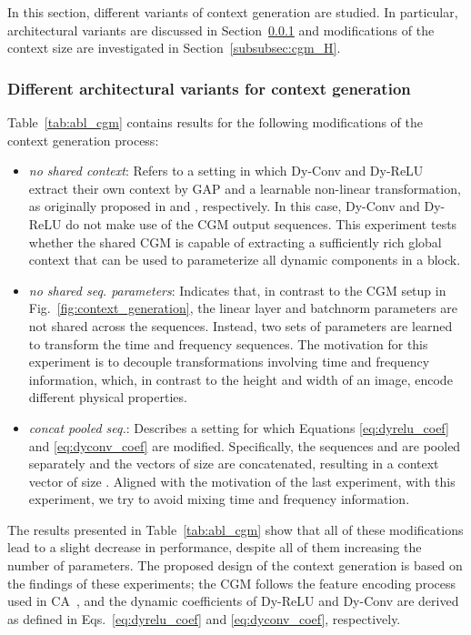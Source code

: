 \documentclass[lettersize,journal]{IEEEtran}
\begin{document}
In this section, different variants of context generation are studied. In particular, architectural variants are discussed in Section~\ref{subsubsec:cgm_variants} and modifications of the context size  are investigated in Section~\ref{subsubsec:cgm_H}.

\subsubsection{Different architectural variants for context generation}
\label{subsubsec:cgm_variants}

Table~\ref{tab:abl_cgm} contains results for the following modifications of the context generation process:
\begin{itemize}
    \item \textit{no shared context}: Refers to a setting in which Dy-Conv and Dy-ReLU extract their own context by GAP and a learnable non-linear transformation, as originally proposed in \cite{chen2020dynamic_conv} and \cite{chen2020dynamic_relu}, respectively. In this case, Dy-Conv and Dy-ReLU do not make use of the CGM output sequences. This experiment tests whether the shared CGM is capable of extracting a sufficiently rich global context that can be used to parameterize all dynamic components in a block.
    \item \textit{no shared seq. parameters}: Indicates that, in contrast to the CGM setup in Fig.~\ref{fig:context_generation}, the linear layer and batchnorm parameters are not shared across the sequences. Instead, two sets of parameters are learned to transform the time and frequency sequences. The motivation for this experiment is to decouple transformations involving time and frequency information, which, in contrast to the height and width of an image, encode different physical properties.
    \item \textit{concat pooled seq.}: Describes a setting for which Equations \ref{eq:dyrelu_coef} and \ref{eq:dyconv_coef} are modified. Specifically, the sequences  and  are pooled separately and the vectors of size  are concatenated, resulting in a context vector of size . Aligned with the motivation of the last experiment, with this experiment, we try to avoid mixing time and frequency information.
\end{itemize}

The results presented in Table~\ref{tab:abl_cgm} show that all of these modifications lead to a slight decrease in performance, despite all of them increasing the number of parameters. The proposed design of the context generation is based on the findings of these experiments; the CGM follows the feature encoding process used in CA~\cite{hou2021coordinate}, and the dynamic coefficients of Dy-ReLU and Dy-Conv are derived as defined in Eqs.~\ref{eq:dyrelu_coef} and \ref{eq:dyconv_coef}, respectively.
\end{document}
